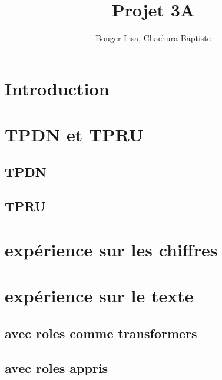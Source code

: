 \documentclass[12pt]{article}
\title{Projet 3A}
\author{Bouger Lisa, Chachura Baptiste}
\begin{document}
\maketitle

\vspace{0.5in}
\tableofcontents
\newpage

\section{Introduction}
\section{TPDN et TPRU}
\subsection{TPDN}
\subsection{TPRU}
\section{expérience sur les chiffres}
\section{expérience sur le texte}
\subsection{avec roles comme transformers}
\subsection{ avec roles appris }

\end{document}
